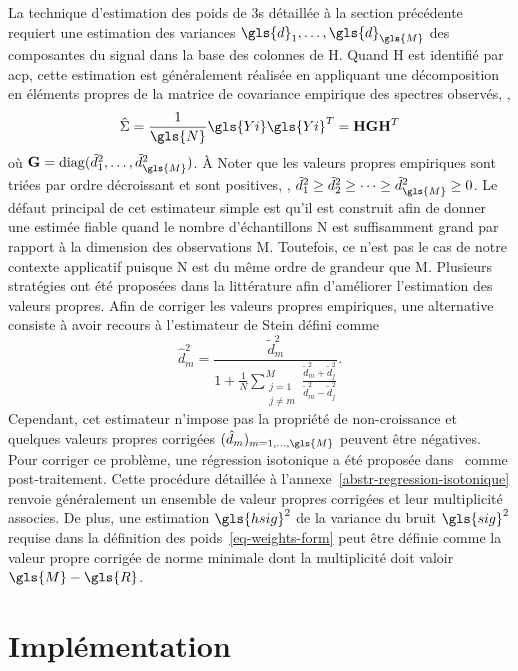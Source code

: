 La technique d'estimation des poids de \gls{3s} détaillée à la section précédente requiert une estimation des variances $\gls{d}_1,\dots,\gls{d}_{\gls{M}}$ des composantes du signal dans la base des colonnes de \gls{H}. Quand \gls{H} est identifié par \gls{acp}, cette estimation est généralement réalisée en appliquant une décomposition en éléments propres de la matrice de covariance empirique des spectres observés, \ie{},
\begin{equation}
    \hat{\Sigma} = \frac{1}{\gls{N}}\gls{Yi}\gls{Yi}^T = \mathbf{H}\mathbf{G}\mathbf{H}^T
\end{equation}
où $\mathbf{G} = \mathrm{diag}(\tilde{d}_1^2, \dots, \tilde{d}_{\gls{M}}^2)$. \`A Noter que les valeurs propres empiriques sont triées par ordre décroissant et sont positives, \ie{}, $\tilde{d}_1^2 \geq \tilde{d}_2^2 \geq \dots \geq \tilde{d}_{\gls{M}}^2\geq 0$. Le défaut principal de cet estimateur simple est qu'il est construit afin de donner une estimée fiable quand le nombre d'échantillons \gls{N} est suffisamment grand par rapport à la dimension des observations \gls{M}. Toutefois, ce n'est pas le cas de notre contexte applicatif puisque \gls{N} est du même ordre de grandeur que \gls{M}. Plusieurs stratégies ont été proposées dans la littérature afin d'améliorer l'estimation des valeurs propres. Afin de corriger les valeurs propres empiriques, une alternative consiste à avoir recours à l'estimateur de Stein défini comme~\cite{mestre2008improved}
\begin{equation}\label{eq-Stein-corr}
\hat{d}^2_m = 
\frac{\tilde{d}^2_m}{1+ \frac{1}{N}\sum_{\substack{j=1\\j\neq m }}^M \frac{\tilde{d}^2_m+\tilde{d}^2_j}{\tilde{d}^2_m-\tilde{d}^2_j}}.
\end{equation}
Cependant, cet estimateur n'impose pas la propriété de non-croissance et quelques valeurs propres corrigées $(\hat{d}_m)_{m=1,\dots,\gls{M}}$ peuvent être négatives. Pour corriger ce problème, une régression isotonique a été proposée dans~\cite{LinPerl1985} comme post-traitement. Cette procédure détaillée à l'annexe~\ref{abstr-regression-isotonique} renvoie généralement un ensemble de valeur propres corrigées et leur multiplicité associes. De plus, une estimation $\gls{hsig}^2$ de la variance du bruit $\gls{sig}^2$ requise dans la définition des poids~\eqref{eq-weights-form} peut être définie comme la valeur propre corrigée de norme minimale dont la multiplicité doit valoir $\gls{M} - \gls{R}$.

%
\section{Implémentation}

